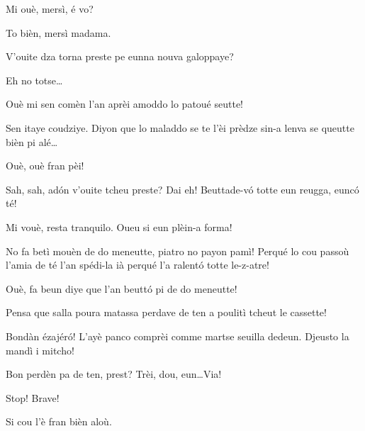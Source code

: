 \begin{drama}
\Gerominespeaks Mi ouè, mersì, é vo?

\FennepulisieBspeaks To bièn, mersì madama.

\Gerominespeaks V'ouite dza torna preste pe eunna nouva galoppaye?

\FennepulisieBspeaks Eh no totse\ldots

\Casimirspeaks Ouè mi sen comèn l’an aprèi amoddo lo patoué seutte!

\FennepulisieCspeaks Sen itaye coudziye. Diyon que lo maladdo se te l’èi prèdze sin-a lenva se queutte bièn pi alé\ldots

\Casimirspeaks Ouè, ouè fran pèi!


\Starterspeaks Sah, sah, ad\'on v'ouite tcheu preste? Dai eh! Beuttade-v\'o totte eun reugga, eunc\'o té!

\FennepulisieAspeaks Mi vouè, resta tranquilo. Oueu si eun plèin-a forma!

\Starterspeaks No fa betì mouèn de do meneutte, piatro no payon pamì! Perqué lo cou passoù  l'amia de té l’an spédi-la ià perqué l’a ralent\'o totte le-z-atre!

\FennepulisieBspeaks Ouè, fa beun diye que l’an beutt\'o pi de do meneutte!

\FennepulisieCspeaks Pensa que salla poura matassa perdave de ten a poulitì tcheut le cassette!

\FennepulisieAspeaks Bondàn ézajér\'o! L’ayè panco comprèi comme martse seuilla dedeun. Djeusto la mandì i mitcho!

\Starterspeaks Bon perdèn pa de ten, prest? Trèi, dou, eun\ldots Via!




\Starterspeaks Stop! Brave!

\FennepulisieBspeaks Si cou l’è fran bièn aloù.


\end{drama}
